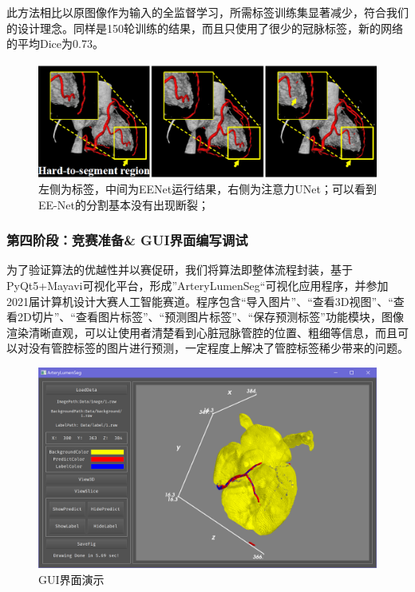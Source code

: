 \documentclass[lang=cn,11pt,a4paper,cite=numbers]{elegantpaper}
\begin{document}
此方法相比以原图像作为输入的全监督学习，所需标签训练集显著减少，符合我们的设计理念。同样是150轮训练的结果，而且只使用了很少的冠脉标签，新的网络的平均Dice为0.73。

\begin{figure}[H]
    \centering
    \includegraphics[scale=0.5]{./image/前期总结/Result.png}
    \caption{左侧为标签，中间为EENet运行结果，右侧为注意力UNet；可以看到EE-Net的分割基本没有出现断裂；}
    \label{fig:Result}
\end{figure}

\subsubsection{第四阶段：竞赛准备\& GUI界面编写调试}

为了验证算法的优越性并以赛促研，我们将算法即整体流程封装，基于PyQt5+Mayavi可视化平台，形成”ArteryLumenSeg“可视化应用程序，并参加2021届计算机设计大赛人工智能赛道。程序包含“导入图片”、“查看3D视图”、“查看2D切片”、“查看图片标签”、“预测图片标签”、“保存预测标签”功能模块，图像渲染清晰直观，可以让使用者清楚看到心脏冠脉管腔的位置、粗细等信息，而且可以对没有管腔标签的图片进行预测，一定程度上解决了管腔标签稀少带来的问题。

\begin{figure}[H]
    \centering
    \includegraphics[scale=0.2]{./image/前期总结/GUI.png}
    \caption{GUI界面演示}
    \label{fig:GUI}
\end{figure}
\end{document}
